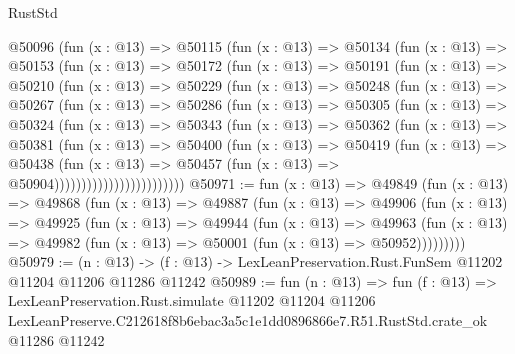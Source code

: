 \begin{lexlean}{RustStd}
\begin{coremodule}
          @50096
            (fun (x : @13) =>
            @50115
              (fun (x : @13) =>
              @50134
                (fun (x : @13) =>
                @50153
                  (fun (x : @13) =>
                  @50172
                    (fun (x : @13) =>
                    @50191
                      (fun (x : @13) =>
                      @50210
                        (fun (x : @13) =>
                        @50229
                          (fun (x : @13) =>
                          @50248
                            (fun (x : @13) =>
                            @50267
                              (fun (x : @13) =>
                              @50286
                                (fun (x : @13) =>
                                @50305
                                  (fun (x : @13) =>
                                  @50324
                                    (fun (x : @13) =>
                                    @50343
                                      (fun (x : @13) =>
                                      @50362
                                        (fun (x : @13) =>
                                        @50381
                                          (fun (x : @13) =>
                                          @50400
                                            (fun (x : @13) =>
                                            @50419
                                              (fun (x : @13) =>
                                              @50438
                                                (fun (x : @13) =>
                                                @50457
                                                  (fun (x : @13) => @50904))))))))))))))))))))))))
@50971 := fun (x : @13) =>
  @49849
    (fun (x : @13) =>
    @49868
      (fun (x : @13) =>
      @49887
        (fun (x : @13) =>
        @49906
          (fun (x : @13) =>
          @49925
            (fun (x : @13) =>
            @49944
              (fun (x : @13) =>
              @49963
                (fun (x : @13) => @49982 (fun (x : @13) => @50001 (fun (x : @13) => @50952)))))))))
@50979 := (n : @13) ->
  (f : @13) -> LexLeanPreservation.Rust.FunSem @11202 @11204 @11206 @11286 @11242
@50989 := fun (n : @13) =>
  fun (f : @13) =>
  LexLeanPreservation.Rust.simulate
    @11202
    @11204
    @11206
    LexLeanPreserve.C212618f8b6ebac3a5c1e1dd0896866e7.R51.RustStd.crate_ok
    @11286
    @11242
\end{coremodule}
\end{lexlean}
